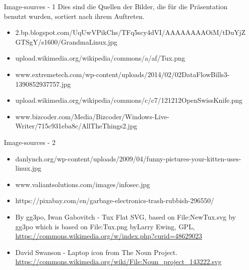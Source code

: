 \begin{frame}{Image-sources - 1}
	Dies sind die Quellen der Bilder, die für die Präsentation benutzt wurden, sortiert nach ihrem Auftreten.
	\begin{itemize}
		\item [1] 2.bp.blogspot.com/\textunderscore UqUwVPikChs/TFq5scy4dVI/AAAAAAAAOiM/tDuYjZGTSgY/s1600/GrandmaLinux.jpg
		\item [2] upload.wikimedia.org/wikipedia/commons/a/af/Tux.png
		\item [3] www.extremetech.com/wp-content/uploads/2014/02/02DataFlowBills3-1390852937757.jpg
		
		\item [4] upload.wikimedia.org/wikipedia/commons/c/c7/121212\textunderscore OpenSwissKnife.png
		\item [5] www.bizcoder.com/Media/Bizcoder/Windows-Live-Writer/715c931eba8c/AllTheThings\textunderscore 2.jpg
	\end{itemize}
\end{frame}

\begin{frame}{Image-sources - 2}
	\begin{itemize}
		\item [6] danlynch.org/wp-content/uploads/2009/04/funny-pictures-your-kitten-uses-linux.jpg
		\item [7] www.valiantsolutions.com/images/infosec.jpg
		\item [8] https://pixabay.com/en/garbage-electronics-trash-rubbish-296550/
		\item [9] By gg3po, Iwan Gabovitch - Tux Flat SVG, based on File:NewTux.svg by gg3po which is based on File:Tux.png byLarry Ewing, GPL, \url{https://commons.wikimedia.org/w/index.php?curid=48629023}
		\item [9] David Swanson - Laptop icon from The Noun Project. \url{https://commons.wikimedia.org/wiki/File:Noun_project_143222.svg}
	\end{itemize}
\end{frame}
